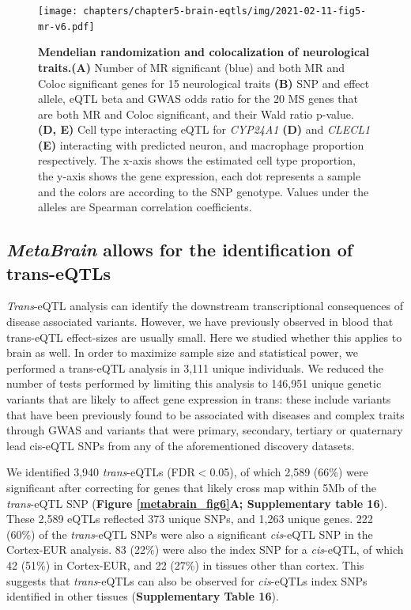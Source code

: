\begin{figure}[H]
	\texttt{[image: chapters/chapter5-brain-eqtls/img/2021-02-11-fig5-mr-v6.pdf]}
	\caption{\textbf{Mendelian randomization and colocalization of neurological traits.}\textbf{(A)} Number of MR significant (blue) and both MR and Coloc significant genes for 15  neurological traits \textbf{(B)} SNP and effect allele, eQTL beta and GWAS odds ratio for the 20 MS genes that are both MR and Coloc significant, and their Wald ratio p-value. \textbf{(D, E)} Cell type interacting eQTL for \emph{CYP24A1} \textbf{(D)} and \emph{CLECL1} \textbf{(E)} interacting with predicted neuron, and macrophage proportion respectively. The x-axis shows the estimated cell type proportion, the y-axis shows the gene expression, each dot represents a sample and the colors are according to the SNP genotype. Values under the alleles are Spearman correlation coefficients.}
	\label{metabrain_fig5}
\end{figure}

\subsection{\emph{MetaBrain}  allows for the identification of trans-eQTLs }
\emph{Trans}-eQTL analysis can identify the downstream transcriptional consequences of disease associated variants. However, we have previously observed in blood that trans-eQTL effect-sizes are usually small. Here we studied whether this applies to brain as well. In order to maximize sample size and statistical power, we performed a trans-eQTL analysis in 3,111 unique individuals. We reduced the number of tests performed by limiting this analysis to 146,951 unique genetic variants that are likely to affect gene expression in trans: these include variants that have been previously found to be associated with diseases and complex traits through GWAS and variants that were primary, secondary, tertiary or quaternary lead cis-eQTL SNPs from any of the aforementioned discovery datasets.  

We identified 3,940 \emph{trans}-eQTLs (FDR$<$0.05), of which 2,589 (66\%) were significant after correcting for genes that likely cross map within 5Mb of the \emph{trans}-eQTL SNP (\textbf{Figure \ref{metabrain_fig6}A; Supplementary table 16}). These 2,589 eQTLs reflected 373 unique SNPs, and 1,263 unique genes.  222 (60\%) of the \emph{trans}-eQTL SNPs were also a significant \emph{cis}-eQTL SNP in the Cortex-EUR analysis. 83 (22\%) were also the index SNP for a \emph{cis}-eQTL, of which 42 (51\%) in Cortex-EUR, and 22 (27\%) in tissues other than cortex. This suggests that \emph{trans}-eQTLs can also be observed for \emph{cis}-eQTLs index SNPs identified in other tissues (\textbf{Supplementary Table 16}). 

